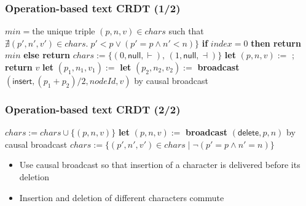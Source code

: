 \begin{frame}
    \label{s:text-crdt-alg1}
    \frametitle{Operation-based text CRDT (1/2)}
    \footnotesize
    \begin{algorithmic}
            \State $\mathit{min} = \text{the unique triple } (p,n,v) \in \mathit{chars}$ such that
            \State \hspace{3.1em}$\nexists (p',n',v') \in \mathit{chars}.\; p' < p \vee (p' = p \wedge n' < n)\}$
            \State \textbf{if} $\mathit{index}=0$ \textbf{then return} $\mathit{min}$
            \State \textbf{else return} 
        \EndFunction
        \State
            \State $\mathit{chars} := \{(0, \mathsf{null}, \vdash),\, (1, \mathsf{null}, \dashv)\}$
        \EndOn
        \State
            \State \textbf{let} $(p,n,v) := $ ; \textbf{return} $v$
        \EndOn
        \State
            \State \textbf{let} $(p_1,n_1,v_1) := $ 
            \State \textbf{let} $(p_2,n_2,v_2) := $ 
            \State \textbf{broadcast} $(\mathsf{insert}, (p_1+p_2)/2, \mathit{nodeId}, v)$ by causal broadcast
        \EndOn
    \end{algorithmic}
\end{frame}
\label{l:text-crdt-alg1}

\begin{frame}
    \label{s:text-crdt-alg2}
    \frametitle{Operation-based text CRDT (2/2)}
    \begingroup\footnotesize
    \begin{algorithmic}
            \State $\mathit{chars} := \mathit{chars} \cup \{(p,n,v)\}$
        \EndOn
        \State
            \State \textbf{let} $(p,n,v) := $ 
            \State \textbf{broadcast} $(\mathsf{delete}, p, n)$ by causal broadcast
        \EndOn
        \State
            \State $\mathit{chars} := \{(p',n',v') \in \mathit{chars} \mid \neg (p' = p \wedge n' = n)\}$
        \EndOn
    \end{algorithmic}
    \endgroup\vspace{1em}
    \begin{itemize}
        \item Use causal broadcast so that insertion of a character is delivered before its deletion
        \item Insertion and deletion of different characters commute
    \end{itemize}
\end{frame}
\label{l:text-crdt-alg2}

